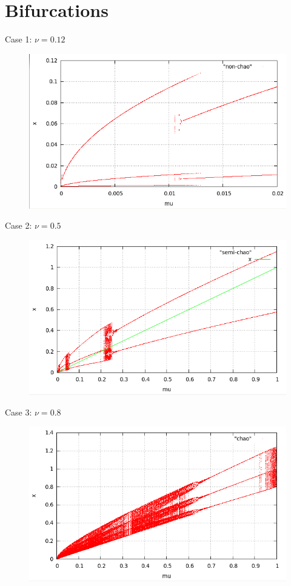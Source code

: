 \documentclass[xcolor=x11names,compress]{beamer}
\renewcommand{\(}{\begin{columns}}
\renewcommand{\)}{\end{columns}}
\newcommand{\<}[1]{\begin{column}{#1}}
\renewcommand{\>}{\end{column}}
\begin{document}
\section{Bifurcations}
\begin{frame}{Case 1: $\nu=0.12$}
\begin{figure}
  \caption{}
  \begin{center}
    \includegraphics[width=0.9\columnwidth]{non-chao}
  \end{center}
\end{figure}
\end{frame}

\begin{frame}{Case 2: $\nu=0.5$}
\begin{figure}
  \caption{}
  \begin{center}
    \includegraphics[width=0.9\columnwidth]{semi-chao}
  \end{center}
\end{figure}
\end{frame}

\begin{frame}{Case 3: $\nu=0.8$}
\begin{figure}
  \caption{}
  \begin{center}
    \includegraphics[width=0.9\columnwidth]{chao}
  \end{center}
\end{figure}
\end{frame}
\end{document}
